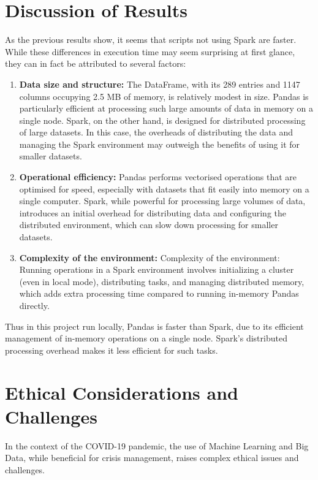 \documentclass[12pt,oneside]{book} %
\begin{document}
\newpage

\section{Discussion of Results}\label{sec:discussion-of-results}
As the previous results show, it seems that scripts not using Spark are faster.
While these differences in execution time may seem surprising at first glance,
they can in fact be attributed to several factors:

\begin{enumerate}
    \item \textbf{Data size and structure:} The DataFrame, with its 289 entries and 1147 columns occupying 2.5 MB of memory, is relatively modest in size. Pandas is particularly efficient at processing such large amounts of data in memory on a single node. Spark, on the other hand, is designed for distributed processing of large datasets. In this case, the overheads of distributing the data and managing the Spark environment may outweigh the benefits of using it for smaller datasets.
    \item \textbf{Operational efficiency:} Pandas performs vectorised operations that are optimised for speed, especially with datasets that fit easily into memory on a single computer. Spark, while powerful for processing large volumes of data, introduces an initial overhead for distributing data and configuring the distributed environment, which can slow down processing for smaller datasets.
    \item \textbf{Complexity of the environment:} Complexity of the environment: Running operations in a Spark environment involves initializing a cluster (even in local mode), distributing tasks, and managing distributed memory, which adds extra processing time compared to running in-memory Pandas directly.
\end{enumerate}

Thus in this project run locally, Pandas is faster than Spark, due to its
efficient management of in-memory operations on a single node. Spark's
distributed processing overhead makes it less efficient for such tasks.

\newpage
\section{Ethical Considerations and Challenges}

In the context of the COVID-19 pandemic, the use of Machine Learning and Big
Data, while beneficial for crisis management, raises complex ethical issues and
challenges.\newline
\end{document}
